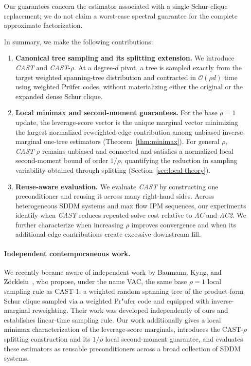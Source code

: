\documentclass{article}
\newcommand{\CAST}{\textit{CAST}\xspace}
\newcommand{\AC}{\textit{AC}\xspace}
\newcommand{\ACtwo}{\textit{AC2}\xspace}
\newcommand{\calO}{\mathcal{O}}
\newcommand{\bigO}{\calO}
\newcommand{\1}{\mathbbm{1}}
\theoremstyle{plain}
\begin{document}
Our guarantees concern the estimator associated with a single Schur-clique replacement; we do not claim a worst-case spectral guarantee for the complete approximate factorization.


In summary, we make the following contributions:

\begin{enumerate}
\item \textbf{Canonical tree sampling and its splitting extension.}
We introduce \CAST{} and \CAST-$\rho$. At a degree-$d$ pivot, a tree is sampled exactly from the target weighted spanning-tree distribution and contracted in $\bigO(\rho d)$ time using weighted Pr\"ufer codes, without materializing either the original or the expanded dense Schur clique.

\item \textbf{Local minimax and second-moment guarantees.}
For the base $\rho=1$ update, the leverage-score vector is the unique
marginal vector minimizing the largest normalized reweighted-edge
contribution among unbiased inverse-marginal one-tree estimators
(Theorem~\ref{thm:minimax}). For general $\rho$, \CAST-$\rho$ remains
unbiased and connected and satisfies a normalized local second-moment bound of order $1/\rho$, quantifying the reduction in sampling variability obtained through splitting (Section~\ref{sec:local-theory}).

\item \textbf{Reuse-aware evaluation.}
We evaluate \CAST{} by constructing one preconditioner and reusing it across many right-hand sides. Across heterogeneous SDDM systems and max flow IPM sequences, our experiments identify when \CAST{} reduces repeated-solve cost relative to \AC{} and \ACtwo{}. We further characterize when increasing $\rho$ improves convergence and when its additional edge contributions
create excessive downstream fill.
\end{enumerate}



\paragraph{Independent contemporaneous work.}
We recently became aware of independent work by Baumann, Kyng, and Zöcklein~\cite{baumann2026vac}, who propose, under the name VAC, the same base $\rho=1$ local sampling rule as CAST-1: a weighted random spanning tree of the product-form Schur clique sampled via a weighted Pr"ufer code and equipped with inverse-marginal reweighting. Their work was developed independently of ours and establishes linear-time sampling rule. Our work additionally gives a local minimax characterization of the leverage-score marginals, introduces the CAST-$\rho$ splitting construction and its $1/\rho$ local second-moment guarantee, and evaluates these estimators as reusable preconditioners across a broad collection of SDDM systems.
\end{document}

